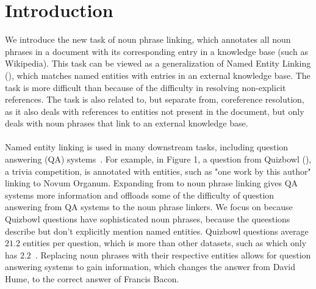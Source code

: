 \section{Introduction}
\label{sec:intro}

We introduce the new task of noun phrase linking, which annotates all noun phrases in a document with its corresponding entry in a knowledge base (such as Wikipedia). 
This task can be viewed as a generalization of Named Entity Linking (\nel{}), which matches named entities with entries in an external knowledge base. 
The task is more difficult than \nel{} because of the difficulty in resolving non-explicit references. 
The task is also related to, but separate from, coreference resolution, as it also deals with references to entities not present in the document, but only deals with noun phrases that link to an external knowledge base. 
\\
\\
Named entity linking is used in many downstream tasks, including question answering (QA) systems~\cite{yamada2018studio}. 
For example, in Figure 1, a question from Quizbowl (\qb{}), a trivia competition, is annotated with entities, such as "one work by this author" linking to Novum Organum. 
Expanding from \nel{} to noun phrase linking gives QA systems more information and offloads some of the difficulty of question answering from QA systems to the noun phrase linkers. 
We focus on \qb{} because Quizbowl questions have sophisticated noun phrases, because the queestions describe but don't explicitly mention named entities. 
Quizbowl questions average $21.2$ entities per question, which is more than other datasets, such as \triviaqa{} which only has $2.2$~\cite{zhao2020delft}.  
Replacing noun phrases with their respective entities allows for question answering systems to gain information, which changes the answer from David Hume, to the correct answer of Francis Bacon. 
